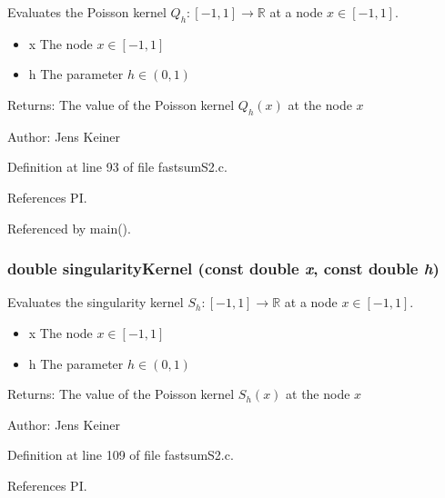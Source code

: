 Evaluates the Poisson kernel $Q_h: [-1,1] \rightarrow \mathbb{R}$ at a node $x \in [-1,1]$. 

\begin{itemize}
\item x The node $x \in [-1,1]$ \item h The parameter $h \in (0,1)$\end{itemize}
\begin{Desc}
\item[Returns:]The value of the Poisson kernel $Q_h(x)$ at the node $x$\end{Desc}
\begin{Desc}
\item[Author:]Jens Keiner \end{Desc}


Definition at line 93 of file fastsum\-S2.c.

References PI.

Referenced by main().\hypertarget{group__applications__fastsumS2__test_ga2}{
\subsubsection[singularityKernel]{\setlength{\rightskip}{0pt plus 5cm}double singularity\-Kernel (const double {\em x}, const double {\em h})}}
\label{group__applications__fastsumS2__test_ga2}


Evaluates the singularity kernel $S_h: [-1,1] \rightarrow \mathbb{R}$ at a node $x \in [-1,1]$. 

\begin{itemize}
\item x The node $x \in [-1,1]$ \item h The parameter $h \in (0,1)$\end{itemize}
\begin{Desc}
\item[Returns:]The value of the Poisson kernel $S_h(x)$ at the node $x$\end{Desc}
\begin{Desc}
\item[Author:]Jens Keiner \end{Desc}


Definition at line 109 of file fastsum\-S2.c.

References PI.

